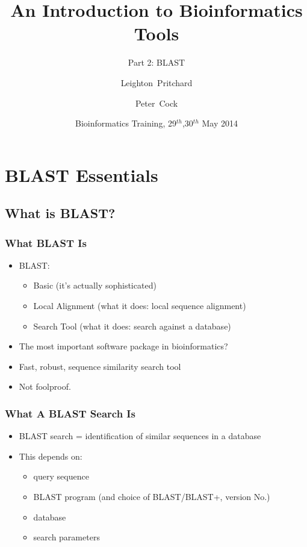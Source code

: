 \documentclass[table]{beamer}
\title[Intro to Bioinformatics] %
{An Introduction to Bioinformatics Tools}
\subtitle{Part 2: BLAST}
\author[Pritchard, Cock] %
{Leighton~Pritchard \and Peter~Cock}
\institute[The James Hutton Institute] %
{
  Information and Computational Sciences\\
  The James Hutton Institute
}
\date[May 2014] %
{Bioinformatics Training, 29$^{th}$,30$^{th}$ May 2014}
\begin{document}
  \frame[plain]{\titlepage}
  
  \section{BLAST Essentials}
  
    \subsection{What is BLAST?}
    \begin{frame}
     \frametitle{What BLAST Is}
     \begin{itemize}
       \item<1-> BLAST:
       \begin{itemize}
         \item<1-> Basic (it's actually sophisticated)
         \item<1-> Local Alignment (what it does: local sequence alignment)
         \item<1-> Search Tool (what it does: search against a database)
       \end{itemize}
       \item<2-> The most important software package in bioinformatics?
       \item<2-> Fast, robust, sequence similarity search tool
       \item<2-> Not foolproof.
     \end{itemize}
    \end{frame}
  
    \begin{frame}
     \frametitle{What A BLAST Search Is}
     \begin{itemize}
       \item BLAST search = identification of similar sequences in a database
       \item This depends on:
       \begin{itemize}
         \item query sequence
         \item BLAST program (and choice of BLAST/BLAST+, version No.)
         \item database
         \item search parameters
       \end{itemize}
     \end{itemize}
    \end{frame}  
  
\end{document}
